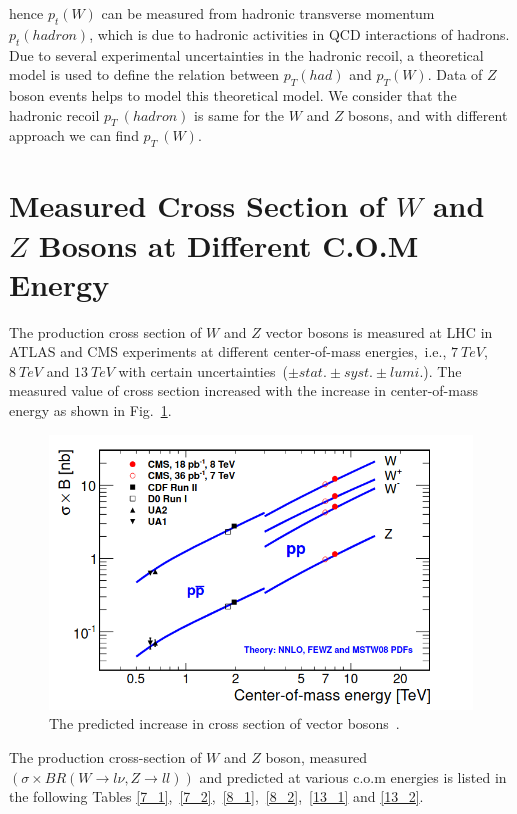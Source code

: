 hence $p_{t}(W)$ can be measured from hadronic transverse momentum $p_{t}(hadron)$, which is due to hadronic activities in QCD interactions of hadrons. Due to several experimental uncertainties in the hadronic recoil, a theoretical model is used to define the relation between $p_{T}(had)$ and $p_{T}(W)$. Data of $Z$ boson events helps to model this theoretical model. We consider that the hadronic recoil $p_{T}~(hadron)$ is same for the $W$ and $Z$ bosons, and with different approach we can find $p_{T}~(W)$.

\section{Measured Cross Section of $W$ and $Z$ Bosons at Different C.O.M Energy}
The production cross section of $W$ and $Z$ vector bosons is measured at LHC in ATLAS and CMS experiments at different center-of-mass energies,~i.e., $7~TeV$, $8~TeV$ and $13~TeV$  with certain uncertainties~($\pm stat.\pm syst.\pm lumi.$). The measured value of cross section increased with the increase in center-of-mass energy as shown in Fig.~\ref{pred-inc}.
\begin{figure}[h!]
\centering
\includegraphics[scale=0.5]{chapter3/cross-sction-inc.png}
\caption{The predicted increase in cross section of vector bosons~\cite{Chatrchyan_2014}.}
\label{pred-inc}
\end{figure}
The production cross-section of $W$ and $Z$ boson, measured~$(\sigma\times BR(W\rightarrow l\nu, Z\rightarrow ll))$ and predicted at various c.o.m energies is listed in the following Tables \ref{7_1},~\ref{7_2},~\ref{8_1},~\ref{8_2},~\ref{13_1} and \ref{13_2}.


